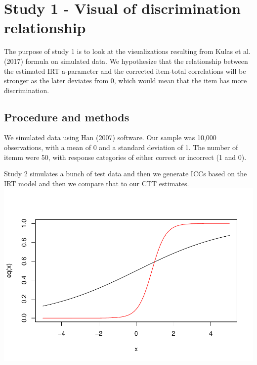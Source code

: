 \documentclass[
  english,
  man,floatsintext]{apa6}
\begin{document}
\hypertarget{study-1---visual-of-discrimination-relationship}{%
\section{Study 1 - Visual of discrimination relationship}\label{study-1---visual-of-discrimination-relationship}}

The purpose of study 1 is to look at the visualizations resulting from Kulas et al. (2017) formula on simulated data. We hypothesize that the relationship between the estimated IRT a-parameter and the corrected item-total correlations will be stronger as the later deviates from 0, which would mean that the item has more discrimination.

\hypertarget{procedure-and-methods}{%
\subsection{Procedure and methods}\label{procedure-and-methods}}

We simulated data using Han (2007) software. Our sample was 10,000 observations, with a mean of 0 and a standard deviation of 1. The number of itemm were 50, with response categories of either correct or incorrect (1 and 0).

Study 2 simulates a bunch of test data and then we generate ICCs based on the IRT model and then we compare that to our CTT estimates.\\

\includegraphics{ICC_project_files/figure-latex/unnamed-chunk-2-1.pdf}
\end{document}
